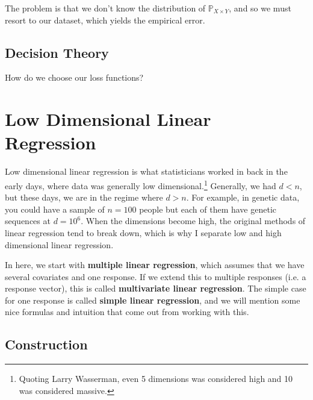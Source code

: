 \documentclass{article}
\begin{document}
    The problem is that we don't know the distribution of $\mathbb{P}_{X \times Y}$, and so we must resort to our dataset, which yields the empirical error.  

  \subsection{Decision Theory}

    How do we choose our loss functions? 

\section{Low Dimensional Linear Regression}

    Low dimensional linear regression is what statisticians worked in back in the early days, where data was generally low dimensional.\footnote{Quoting Larry Wasserman, even 5 dimensions was considered high and 10 was considered massive. } Generally, we had $d < n$, but these days, we are in the regime where $d > n$. For example, in genetic data, you could have a sample of $n = 100$ people but each of them have genetic sequences at $d = 10^6$. When the dimensions become high, the original methods of linear regression tend to break down, which is why I separate low and high dimensional linear regression. 

    In here, we start with \textbf{multiple linear regression}, which assumes that we have several covariates and one response. If we extend this to multiple responses (i.e. a response vector), this is called \textbf{multivariate linear regression}. The simple case for one response is called \textbf{simple linear regression}, and we will mention some nice formulas and intuition that come out from working with this. 

  \subsection{Construction}
\end{document}
